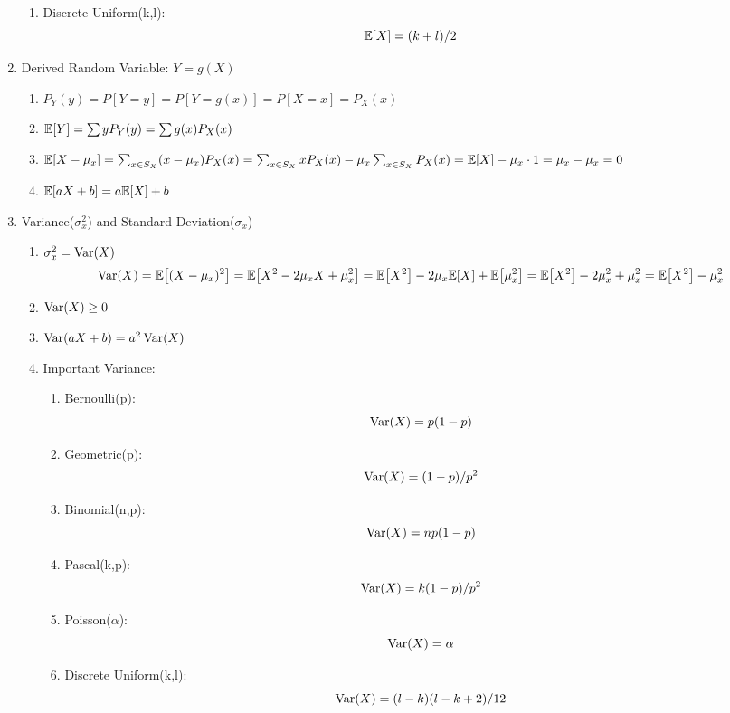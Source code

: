 \begin{enumerate}
{\begin{enumerate}
{\begin{enumerate}
{\begin{enumerate}
                            \item Discrete Uniform(k,l): $$\E{X}=(k+l)/2$$
                        \end{enumerate}
                    }
                \end{enumerate}
            }
        \end{enumerate}
    }
    \item Derived Random Variable: $Y = g(X)${
        \begin{enumerate}
            \item $P_Y(y) = P[Y=y] = P[Y=g(x)] = P[X=x] = P_X(x)$
            \item $\E{Y} = \sum yP_Y(y) = \sum g(x)P_X(x)$
            \item $\E{X-\mu_x}=\sum_{x\in S_X}(x-\mu_x)P_X(x)=\sum_{x\in S_X}xP_X(x)-\mu_x\sum_{x\in S_X}P_X(x)=\E{X}-\mu_x\cdot 1=\mu_x-\mu_x=0$
            \item $\E{aX+b}=a\E{X}+b$
        \end{enumerate}
    }
    \item Variance($\sigma_x^2$) and Standard Deviation($\sigma_x$){
        \begin{enumerate}
            \item $\sigma_x^2=\mathop{\mathrm{Var}}\nolimits(X)$ $$\Var(X)=\E{(X-\mu_x)^2}=\E{X^2-2\mu_xX+\mu_x^2}=\E{X^2}-2\mu_x\E{X}+\E{\mu_x^2}=\E{X^2}-2\mu_x^2+\mu_x^2=\E{X^2}-\mu_x^2$$
            \item $\mathop{\mathrm{Var}}\nolimits(X)\geq 0$
            \item $\mathop{\mathrm{Var}}\nolimits(aX+b)=a^2\mathop{\mathrm{Var}}\nolimits(X)$
            \item Important Variance:{
                \begin{enumerate}
                    \item Bernoulli(p): $$\mathop{\mathrm{Var}}\nolimits(X)=p(1-p)$$
                    \item Geometric(p): $$\mathop{\mathrm{Var}}\nolimits(X)=(1-p)/p^2$$
                    \item Binomial(n,p): $$\mathop{\mathrm{Var}}\nolimits(X)=np(1-p)$$
                    \item Pascal(k,p): $$\mathop{\mathrm{Var}}\nolimits(X)=k(1-p)/p^2$$
                    \item Poisson($\alpha$): $$\mathop{\mathrm{Var}}\nolimits(X)=\alpha$$
                    \item Discrete Uniform(k,l): $$\mathop{\mathrm{Var}}\nolimits(X)=(l-k)(l-k+2)/12$$
                \end{enumerate}
            }
        \end{enumerate}
    }
\end{enumerate}